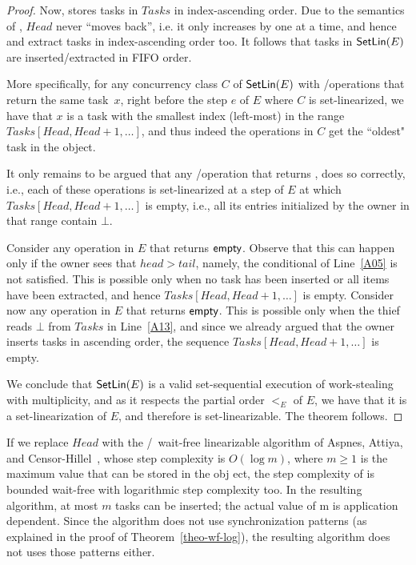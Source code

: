 \begin{proof}
Now, \Put stores tasks in \(Tasks\) in index-ascending order.  Due to the semantics of \MaxReg, \(Head\) never ``moves back'', i.e. it only increases by one at a time, and hence \Take and \Steal extract tasks in index-ascending order too.  It follows that tasks in \({\sf \small SetLin}(E)\) are inserted/extracted in FIFO order.

More specifically, for any concurrency class \(C\) of \({\sf \small SetLin}(E)\) with \Take/\Steal operations that return the same task~\(x\), right before the step \(e\) of \(E\) where \(C\) is set-linearized, we have that \(x\) is a task with the smallest index (left-most) in the range \(Tasks[Head, Head+1, \hdots]\), and thus indeed the operations in \(C\) get the ``oldest" task in the object.

It only remains to be argued that any \Take/\Steal operation that returns \epty, does so correctly, i.e., each of these operations is set-linearized at a step of \(E\) at which \(Tasks[Head, Head+1, \hdots]\) is empty, i.e., all its entries initialized by the owner in that range contain \(\bot\).

Consider any \Take operation in \(E\) that returns \({\sf \small empty}\).  Observe that this can happen only if the owner sees that \(head > tail\), namely, the conditional of Line~\ref{A05} is not satisfied.  This is possible only when no task has been inserted or all items have been extracted, and hence \(Tasks[Head, Head+1, \hdots]\) is empty.  Consider now any \Steal operation in \(E\) that returns \({\sf \small empty}\).  This is possible only when the thief reads \(\bot\) from \(Tasks\) in Line~\ref{A13}, and since we already argued that the owner inserts tasks in ascending order, the sequence \(Tasks[Head, Head+1, \hdots]\) is empty.

We conclude that \({\sf \small SetLin}(E)\) is a valid set-sequential execution of work-stealing with multiplicity, and as it respects the partial order \(<_E\) of \(E\), we have that it is a set-linearization of \(E\), and therefore \WFWSM is set-linearizable. The theorem follows.
\end{proof}

If we replace \(Head\) with the \R/\W\ wait-free linearizable \MaxReg algorithm of Aspnes, Attiya, and Censor-Hillel~\cite{DBLP_journals_jacm_AspnesAC12}, whose step complexity is \(O(\log m)\), where \(m \ge 1\) is the maximum value that can be stored in the obj ect, the step complexity of \WFWSM is bounded wait-free with logarithmic step complexity too. In the resulting algorithm, at most $m$ tasks can be inserted; the actual value of m is application dependent.  Since the algorithm does not use \RAW synchronization patterns (as explained in the proof of Theorem~\ref{theo-wf-log}), the resulting algorithm does not uses those patterns either.


